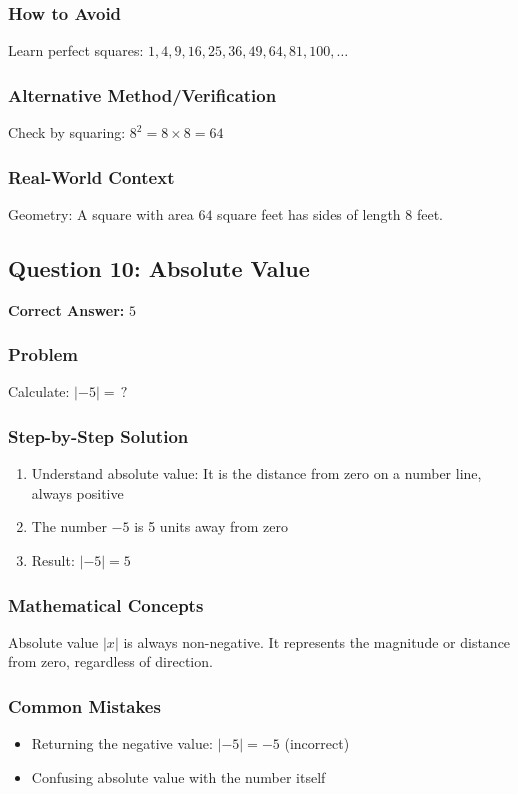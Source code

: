 \documentclass[12pt,a4paper]{article}
\begin{document}
\subsubsection*{How to Avoid}
Learn perfect squares: $1, 4, 9, 16, 25, 36, 49, 64, 81, 100, \ldots$

\subsubsection*{Alternative Method/Verification}
Check by squaring: $8^2 = 8 \times 8 = 64$ 

\subsubsection*{Real-World Context}
Geometry: A square with area $64$ square feet has sides of length $8$ feet.

\vspace{0.5cm}

\subsection*{Question 10: Absolute Value}

\textbf{Correct Answer:} $5$

\subsubsection*{Problem}
Calculate: $|-5| = \,?$

\subsubsection*{Step-by-Step Solution}
\begin{enumerate}
    \item Understand absolute value: It is the distance from zero on a number line, always positive
    \item The number $-5$ is 5 units away from zero
    \item Result: $|-5| = 5$
\end{enumerate}

\subsubsection*{Mathematical Concepts}
Absolute value $|x|$ is always non-negative. It represents the magnitude or distance from zero, regardless of direction.

\subsubsection*{Common Mistakes}
\begin{itemize}
    \item Returning the negative value: $|-5| = -5$ (incorrect)
    \item Confusing absolute value with the number itself
\end{itemize}
\end{document}
